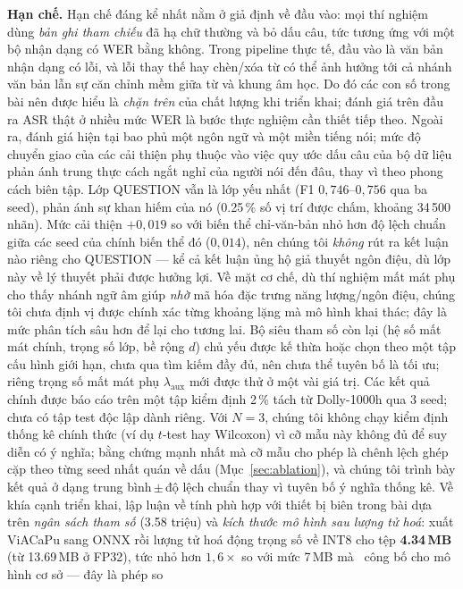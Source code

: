 \documentclass[conference,onecolumn]{IEEEtran}
\begin{document}
\textbf{Hạn chế.} Hạn chế đáng kể nhất nằm ở giả định về đầu vào: mọi thí nghiệm
dùng \emph{bản ghi tham chiếu} đã hạ chữ thường và bỏ dấu câu, tức tương ứng với một
bộ nhận dạng có WER bằng không. Trong pipeline thực tế, đầu vào là văn bản nhận dạng
có lỗi, và lỗi thay thế hay chèn/xóa từ có thể ảnh hưởng tới cả nhánh văn bản lẫn sự
căn chỉnh mềm giữa từ và khung âm học. Do đó các con số trong bài nên được hiểu là
\emph{chặn trên} của chất lượng khi triển khai; đánh giá trên đầu ra ASR thật ở nhiều
mức WER là bước thực nghiệm cần thiết tiếp theo. Ngoài ra, đánh giá hiện tại bao phủ
một ngôn ngữ và một miền tiếng nói;
mức độ chuyển giao của các cải thiện phụ thuộc vào việc quy ước dấu câu của bộ dữ
liệu phản ánh trung thực cách ngắt nghỉ của người nói đến đâu, thay vì theo phong
cách biên tập. Lớp QUESTION vẫn là lớp yếu nhất (F1 $0{,}746$--$0{,}756$ qua ba
seed), phản ánh sự khan hiếm của nó (0.25\,\% số vị trí được chấm, khoảng
34\,500 nhãn). Mức cải thiện $+0{,}019$ so với biến thể chỉ-văn-bản nhỏ hơn độ
lệch chuẩn giữa các seed của chính biến thể đó ($0{,}014$), nên chúng tôi
\emph{không} rút ra kết luận nào riêng cho QUESTION --- kể cả kết luận ủng hộ
giả thuyết ngôn điệu, dù lớp này về lý thuyết phải được hưởng lợi. Về mặt cơ chế, dù thí nghiệm mất mát phụ cho thấy nhánh
ngữ âm giúp \emph{nhờ} mã hóa đặc trưng năng lượng/ngôn điệu, chúng tôi chưa định vị
được chính xác từng khoảng lặng mà mô hình khai thác; đây là mức phân tích sâu hơn
để lại cho tương lai. Bộ siêu tham số còn lại (hệ số mất mát chính, trọng số lớp,
bề rộng $d$) chủ yếu được kế thừa hoặc chọn theo một tập cấu hình giới hạn, chưa qua
tìm kiếm đầy đủ, nên chưa thể tuyên bố là tối ưu; riêng trọng số mất mát phụ
$\lambda_{\mathrm{aux}}$ mới được thử ở một vài giá trị. Các kết quả chính được báo
cáo trên một tập kiểm định 2\,\% tách từ Dolly-1000h qua 3 seed; chưa có tập test
độc lập dành riêng. Với $N=3$, chúng tôi không chạy kiểm định thống kê chính thức
(ví dụ $t$-test hay Wilcoxon) vì cỡ mẫu này không đủ để suy diễn có ý nghĩa; bằng
chứng mạnh nhất mà cỡ mẫu cho phép là chênh lệch ghép cặp theo từng seed nhất quán
về dấu (Mục~\ref{sec:ablation}), và chúng tôi trình bày kết quả ở dạng
trung bình\,$\pm$\,độ lệch chuẩn thay vì tuyên bố ý nghĩa thống kê. Về khía cạnh
triển khai, lập luận về tính phù hợp với thiết bị biên trong bài dựa trên
\emph{ngân sách tham số} (3.58 triệu) và \emph{kích thước mô hình sau lượng tử
hoá}: xuất ViACaPu sang ONNX rồi lượng tử hoá động trọng số về INT8 cho tệp
\textbf{4.34\,MB} (từ 13.69\,MB ở FP32), tức nhỏ hơn $1{,}6\times$ so với mức
7\,MB mà~\cite{you2024lightweight} công bố cho mô hình cơ sở --- đây là phép so
\end{document}
